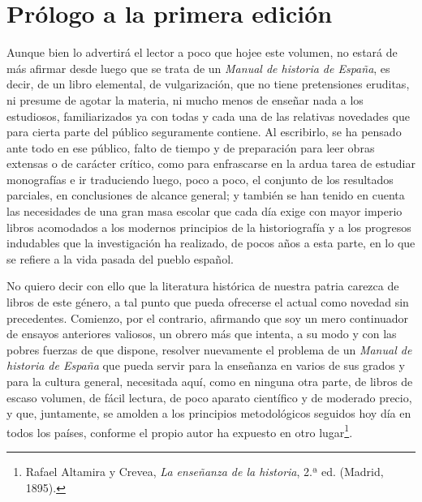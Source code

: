 \section{Prólogo a la primera edición}\label{prologo-a-la-primera-edicion}

Aunque bien lo advertirá el lector a poco que hojee este volumen, no estará de más afirmar desde luego que se trata de un \emph{Manual de historia de España}, es decir, de un libro elemental, de vulgarización, que no tiene pretensiones eruditas, ni presume de agotar la materia, ni mucho menos de enseñar nada a los estudiosos, familiarizados ya con todas y cada una de las relativas novedades que para cierta parte del público seguramente contiene. Al escribirlo, se ha pensado ante todo en ese público, falto de tiempo y de preparación para leer obras extensas o de carácter crítico, como para enfrascarse en la ardua tarea de estudiar monografías e ir traduciendo luego, poco a poco, el conjunto de los resultados parciales, en conclusiones de alcance general; y también se han tenido en cuenta las necesidades de una gran masa escolar que cada día exige con mayor imperio libros acomodados a los modernos principios de la historiografía y a los progresos indudables que la investigación ha realizado, de pocos años a esta parte, en lo que se refiere a la vida pasada del pueblo español.

No quiero decir con ello que la literatura histórica de nuestra patria carezca de libros de este género, a tal punto que pueda ofrecerse el actual como novedad sin precedentes. Comienzo, por el contrario, afirmando que soy un mero continuador de ensayos anteriores valiosos, un obrero más que intenta, a su modo y con las pobres fuerzas de que dispone, resolver nuevamente el problema de un \emph{Manual de historia de España} que pueda servir para la enseñanza en varios de sus grados y para la cultura general, necesitada aquí, como en ninguna otra parte, de libros de escaso volumen, de fácil lectura, de poco aparato científico y de moderado precio, y que, juntamente, se amolden a los principios metodológicos seguidos hoy día en todos los países, conforme el propio autor ha expuesto en otro lugar\footnote{Rafael Altamira y Crevea, \emph{La enseñanza de la historia}, 2.ª ed. (Madrid, 1895).}.

